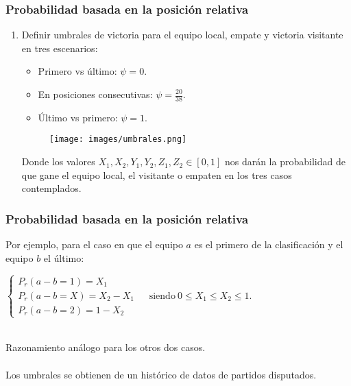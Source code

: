 \documentclass{beamer}
\newcounter{sauvegardeenumi}
\newcommand{\asuivre}{\setcounter{sauvegardeenumi}{\theenumi}}
\newcommand{\suite}{\setcounter{enumi}{\thesauvegardeenumi}}
\begin{document}
	\begin{frame}
		\frametitle{Probabilidad basada en la posición relativa}
		\begin{enumerate}
			\suite
			\item Definir umbrales de victoria para el equipo local, empate y victoria visitante en tres escenarios:
			\begin{itemize}
				\item Primero vs último: $\psi = 0$.
				\item En posiciones consecutivas: $\psi=\frac{20}{38}$.
				\item Último vs primero: $\psi = 1$.
			\end{itemize}    	
			\begin{figure}
				\centering
				\texttt{[image: images/umbrales.png]}
			\end{figure}	
			Donde los valores $X_{1},X_{2},Y_{1},Y_{2},Z_{1},Z_{2} \in [0,1]$ nos darán la probabilidad de que gane el equipo local, el visitante o empaten en los tres casos contemplados.
			\asuivre
		\end{enumerate}		
	\end{frame}

	\begin{frame}
		\frametitle{Probabilidad basada en la posición relativa}	
		Por ejemplo, para el caso en que el equipo $a$ es el primero de la clasificación y el equipo $b$ el último:
		\begin{center}
			$\begin{cases}
			P_{r}(a-b=1)=X_{1}\\
			P_{r}(a-b=X)=X_{2}-X_{1} \ \ \ \ \ \ \ \text{siendo} \ 0 \leq X_{1} \leq X_{2} \leq 1.\\
			P_{r}(a-b=2)=1-X_{2} 
			\end{cases}$\\
		\end{center}
		\ \\
		Razonamiento análogo para los otros dos casos.\\
		\ \\
		Los umbrales se obtienen de un histórico de datos de partidos disputados.
	\end{frame}
	
\end{document}

